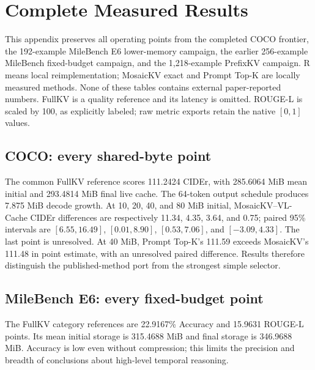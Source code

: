 \section{Complete Measured Results}
\label{app:results}
This appendix preserves all operating points from the completed COCO frontier,
the 192-example MileBench E6 lower-memory campaign, the earlier 256-example
MileBench fixed-budget campaign, and the 1,218-example PrefixKV campaign.
R means local reimplementation; MosaicKV exact and Prompt Top-K are locally
measured methods. None of these tables contains external paper-reported
numbers. FullKV is a quality reference and its latency is omitted.
ROUGE-L is scaled by 100, as explicitly labeled; raw metric exports retain
the native $[0,1]$ values.

\subsection{COCO: every shared-byte point}
\begin{table}[t]
\caption{COCO Caption, 256 images. Each method uses the same measured
initial cap and final/peak storage per sample. CIDEr is a corpus score, not
an average of shard scores. All method--sample rows completed.}
\centering\small
\end{table}
The common FullKV reference scores 111.2424 CIDEr, with 285.6064 MiB
mean initial and 293.4814 MiB final live cache. The 64-token output schedule
produces 7.875 MiB decode growth. At 10, 20, 40, and 80 MiB initial,
MosaicKV--VL-Cache CIDEr differences are respectively 11.34, 4.35, 3.64,
and 0.75; paired 95\% intervals are $[6.55,16.49]$, $[0.01,8.90]$,
$[0.53,7.06]$, and $[-3.09,4.33]$. The last point is unresolved.
At 40 MiB, Prompt Top-K's 111.59 exceeds MosaicKV's 111.48 in point
estimate, with an unresolved paired difference. Results therefore distinguish
the published-method port from the strongest simple selector.

\subsection{MileBench E6: every fixed-budget point}
\begin{table}[t]
\caption{MileBench E6: 192 unique examples, 48 per declared subtask; 96
applicable examples per metric family. Final storage equals peak storage.
All 3,072 rows completed with no fallback, target shortfall, or duplicate.}
\centering\small
\end{table}
\begin{table}[t]
\caption{E6 subtask scores at 40 MiB; 48 examples each. Temporal rows use
Accuracy (\%); semantic rows use ROUGE-L $\times100$. The columns are
not averaged across metric families.}
\centering\small
\end{table}
The FullKV category references are 22.9167\% Accuracy and 15.9631 ROUGE-L
points. Its mean initial storage is 315.4688 MiB and final storage is
346.9688 MiB. Accuracy is low even without compression; this limits the
precision and breadth of conclusions about high-level temporal reasoning.

